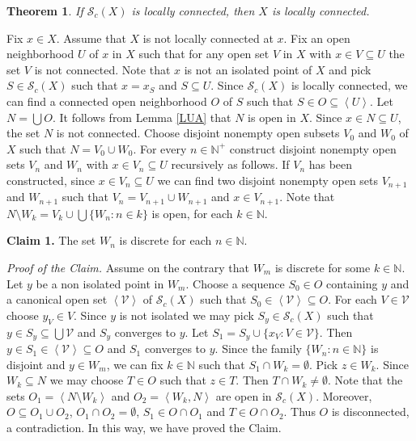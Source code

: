 \documentclass[11pt]{amsart}
\numberwithin{equation}{section}
\theoremstyle{plain}
\newtheorem{theorem}[equation]{Theorem}
\theoremstyle{definition}
\theoremstyle{definition}
\theoremstyle{definition}
\theoremstyle{definition}
\theoremstyle{definition}
\begin{document}
\begin{theorem}
If $\mathcal{S}_c(X)$ is locally connected, then $X$ is locally connected.
\end{theorem}

\proof
Fix $x \in X$. Assume that $X$ is not locally connected at $x$. Fix an open neighborhood $U$ of $x$ in $X$ such that for any open set $V$ in $X$ with $x \in V \subseteq U$ the set $V$ is not connected. Note that $x$ is not an isolated point of $X$ and pick $S \in \mathcal{S}_c(X)$ such that $x = x_S$ and $S \subseteq U$.  Since $\mathcal{S}_c(X)$ is locally connected, we can find a connected open neighborhood $O$ of $S$ such that $S \in O \subseteq \left\langle U\right\rangle$. Let $N = \bigcup O$. It follows from Lemma \ref{LUA} that $N$ is open in $X$. Since $x \in N \subseteq U$, the set $N$ is not connected. Choose disjoint nonempty open subsets $V_0$ and $W_0$ of $X$ such that $N = V_0 \cup W_0$. For every $n \in {\mathbb N}^+$ construct disjoint nonempty open sets $V_n$ and $W_n$ with $x \in V_n \subseteq U$ recursively as follows. If $V_n$ has been constructed, since $x \in V_n \subseteq U$ we can find two disjoint nonempty open sets $V_{n+1}$ and $W_{n+1}$ such that $V_n = V_{n+1} \cup W_{n+1}$ and $x \in V_{n+1}$. Note that $N \setminus W_k = V_k \cup \bigcup\{W_n : n \in k\}$ is open, for each $k \in {\mathbb N}$.\medskip

\textbf{Claim 1.} The set $W_n$ is discrete for each $n \in {\mathbb N}$.\medskip

\textit{Proof of the Claim.} Assume on the contrary that $W_m$ is discrete for some $k \in {\mathbb N}$. Let $y$ be a non isolated point in $W_m$. Choose a sequence $S_0 \in O$ containing $y$ and a canonical open set $\left\langle \mathcal{V}\right\rangle$ of $\mathcal{S}_c(X)$ such that $S_0 \in \left\langle \mathcal{V}\right\rangle \subseteq O$. For each $V \in \mathcal{V}$ choose $y_V \in V$. Since $y$ is not isolated we may pick $S_y \in \mathcal{S}_c(X)$ such that $y \in S_y \subseteq \bigcup \mathcal{V}$ and $S_y$ converges to $y$. Let $S_1 = S_y \cup \{x_V : V \in \mathcal{V}\}$. Then $y \in S_1 \in \left\langle \mathcal{V}\right\rangle \subseteq O$ and $S_1$ converges to $y$. Since the family $\{W_n : n \in {\mathbb N}\}$ is disjoint and $y \in W_m$, we can fix $k \in {\mathbb N}$ such that $S_1 \cap W_k = \emptyset$. Pick $z \in W_k$. Since $W_k \subseteq N$ we may choose $T \in O$ such that $z \in T$. Then $T \cap W_k \not= \emptyset$. Note that the sets $O_1 = \left\langle N \setminus W_k\right\rangle$ and $O_2 = \left\langle W_k,N\right\rangle$ are open in $\mathcal{S}_c(X)$. Moreover, $O \subseteq O_1 \cup O_2$, $O_1 \cap O_2 = \emptyset$, $S_1 \in O \cap O_1$ and $T \in O \cap O_2$. Thus $O$ is disconnected, a contradiction. In this way, we have proved the Claim.\medskip
\end{document}
